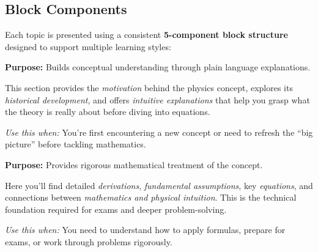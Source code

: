 \subsection*{Block Components}

Each topic is presented using a consistent
\textbf{5-component block structure} designed to support multiple learning styles:

\bigskip

\noindent
\begin{minipage}{0.9\textwidth}
  \begin{tcolorbox}[breakable, colback=GoldBG, colframe=StarGold,
                     leftrule=4pt, arc=0pt,
                     before upper={\textcolor{StarGold}{\textbf{\scshape Physics Intuition}}\par\smallskip}]
    \textbf{Purpose:} Builds conceptual understanding through plain language explanations.

    This section provides the \emph{motivation} behind the physics concept,
    explores its \emph{historical development}, and offers \emph{intuitive explanations}
    that help you grasp what the theory is really about before diving into equations.

    \smallskip
    \textit{Use this when:} You're first encountering a new concept or need to refresh
    the ``big picture'' before tackling mathematics.
  \end{tcolorbox}
\end{minipage}

\bigskip

\noindent
\begin{minipage}{0.9\textwidth}
  \begin{tcolorbox}[colback=TealBG, colframe=NebulaTeal,
                     leftrule=4pt, arc=0pt,
                     before upper={\textcolor{NebulaTeal}{\textbf{\scshape Theory}}\par\smallskip}]
    \textbf{Purpose:} Provides rigorous mathematical treatment of the concept.

    Here you'll find detailed \emph{derivations}, \emph{fundamental assumptions},
    key \emph{equations}, and connections between \emph{mathematics and physical intuition}.
    This is the technical foundation required for exams and deeper problem-solving.

    \smallskip
    \textit{Use this when:} You need to understand how to apply formulas, prepare for exams,
    or work through problems rigorously.
  \end{tcolorbox}
\end{minipage}


